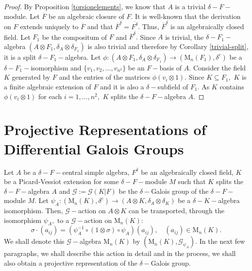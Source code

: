 \documentclass[preprint, 11pt]{amsart}
\theoremstyle{corollary}
\theoremstyle{remark}
\theoremstyle{proposition}
\numberwithin{equation}{subsection}
\begin{document}
\begin{proof} 
	By Proposition \ref{torsionelements}, we know that $A$ is a trivial $\delta-F-$module. Let $\overline{F}$ be an algebraic closure of $F.$ It is well-known that the derivation on $F$ extends uniquely to $\overline{F}$ and that 
	$\overline{F}^\delta=\overline{F^{\delta}}.$ Thus,  $\overline{F}^\delta$ is an algebraically closed field. Let $F_1$ be the compositum of $F$ and $\overline{F}^\delta.$ Since $A$ is trivial, the $\delta-F_1-$algebra  $(A\otimes F_1, \delta_A\otimes\delta_{F_1})$ is also trivial and therefore by Corollary  \ref{trivial-split}, it is a split $\delta-F_1-$algebra. Let $\phi:(A\otimes F_1,\delta_A\otimes \delta_{F_1})\rightarrow (\mathrm{M}_n(F_1), \delta^c)$ be a $\delta-F_1-$isomorphism and $\{v_1,v_2,\dots,v_{n^2}\}$ be an  $F-$basis of $A.$ Consider the field $K$ generated by $F$ and the entries of the matrices $\phi(v_i\otimes 1).$ Since $K\subseteq F_1,$ $K$ is a finite algebraic extension of $F$  and it is also a $\delta-$subfield of $F_1.$ As $K$ contains $\phi(v_i\otimes 1)$ for each $i=1,\dots, n^2,$  $K$ splits the $\delta-F-$algebra $A.$ 
\end{proof}



\section{Projective Representations of Differential Galois Groups} \label{projrep}

  Let $A$ be a $\delta-F-$central simple algebra, $F^{\delta}$ be an algebraically closed field, $K$ be a Picard-Vessiot extension for some $\delta-F-$module $M$ such that $K$ splits the $\delta-F-$algebra $A$ and
$\mathscr{G}:=\mathscr G(K|F)$ be the $\delta-$Galois group of the $\delta-F-$module $M.$  Let $\psi_A: (\mathrm{M}_n(K), \delta^c)\to (A\otimes K, \delta_A\otimes \delta_K)$ be a $\delta-K-$algebra isomorphism. Then,  $\mathscr G-$action on $A\otimes K$  can be transported, through the isomorphism $\psi_A,$ to a $\mathscr{G}-$action on $\mathrm{M}_n(K):$    \begin{equation}\label{actionofGonM_n(K)}  \sigma \cdot (a_{ij})=(\psi^{-1}_A\circ(1\otimes \sigma)\circ \psi_A) (a_{ij}), \quad (a_{ij})\in \mathrm{M}_n(K).\end{equation} 
	We shall denote this $\mathscr G-$algebra $\mathrm{M}_n(K)$ by $(\mathrm{M}_n(K), \mathscr G_{\psi_A}).$ In the next few paragraphs, we shall describe this action in detail and in the process, we shall also obtain a projective representation of the $\delta-$Galois group.
	
\end{document}
